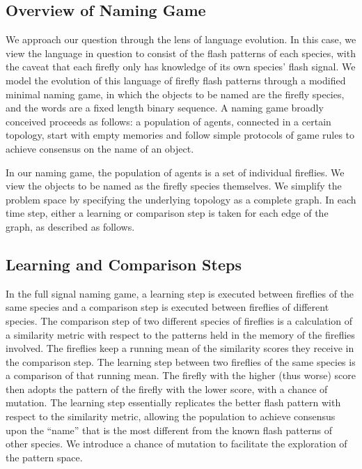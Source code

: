 

\subsection{Overview of Naming Game}
We approach our question through the lens of language evolution. In this case, we view the language in question to consist of the flash patterns of each species, with the caveat that each firefly only has knowledge of its own species' flash signal. 
We model the evolution of this language of firefly flash patterns through a modified minimal naming game, in which the objects to be named are the firefly species, and the words are a fixed length binary sequence.
A naming game broadly conceived proceeds as follows: a population of agents, connected in a certain topology, start with empty memories and follow simple protocols of game rules to achieve consensus on the name of an object. 

In our naming game, the population of agents is a set of individual fireflies.
We view the objects to be named as the firefly species themselves. 
We simplify the problem space by specifying the underlying topology as a complete graph. 
In each time step, either a learning or comparison step is taken for each edge of the graph, as described as follows.

\subsection{Learning and Comparison Steps}
In the full signal naming game, a learning step is executed between fireflies of the same species and a comparison step is executed between fireflies of different species. 
The comparison step of two different species of fireflies is a calculation of a similarity metric with respect to the patterns held in the memory of the fireflies involved. The fireflies keep a running mean of the similarity scores they receive in the comparison step.
The learning step between two fireflies of the same species is a comparison of that running mean. The firefly with the higher (thus worse) score then adopts the pattern of the firefly with the lower score, with a chance of mutation. 
The learning step essentially replicates the better flash pattern with respect to the similarity metric, allowing the population to achieve consensus upon the ``name'' that is the most different from the known flash patterns of other species. 
We introduce a chance of mutation to facilitate the exploration of the pattern space. 

